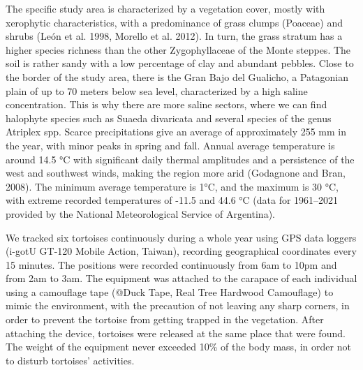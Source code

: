 \documentclass[a4paper]{article}
\begin{document}
The specific study area is characterized by a vegetation cover, mostly with xerophytic characteristics, with a predominance of grass clumps (Poaceae) and shrubs (León et al. 1998, Morello et al. 2012). In turn, the grass stratum has a higher species richness than the other Zygophyllaceae of the Monte steppes. The soil is rather sandy with a low percentage of clay and abundant pebbles. Close to the border of the study area, there is the Gran Bajo del Gualicho, a Patagonian plain of up to 70 meters below sea level, characterized by a high saline concentration. This is why there are more saline sectors, where we can find halophyte species such as Suaeda divaricata and several species of the genus Atriplex spp. Scarce precipitations give an average of approximately 255 mm in the year, with minor peaks in spring and fall. Annual average temperature is around 14.5 °C with significant daily thermal amplitudes and a persistence of the west and southwest winds, making the region more arid (Godagnone and Bran, 2008). The minimum average temperature is 1°C, and the maximum is 30 °C, with extreme recorded temperatures of -11.5 and 44.6 °C (data for 1961--2021 provided by the National Meteorological Service of Argentina).

We tracked six tortoises continuously during a whole year using GPS data loggers (i-gotU GT-120 Mobile Action, Taiwan), recording geographical coordinates every 15 minutes. The positions were recorded continuously from 6am to 10pm and from 2am to 3am. The equipment was attached to the carapace of each individual using a camouflage tape (@Duck Tape, Real Tree Hardwood Camouflage) to mimic the environment, with the precaution of not leaving any sharp corners, in order to prevent the tortoise from getting trapped in the vegetation. After attaching the device, tortoises were released at the same place that were found. The weight of the equipment never exceeded 10\% of the body mass, in order not to disturb tortoises' activities. 
\end{document}
